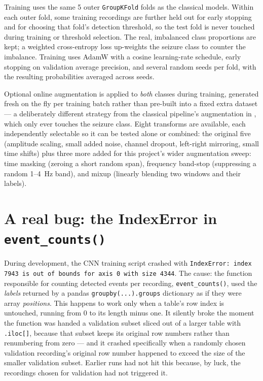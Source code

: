 Training uses the same 5 outer \texttt{GroupKFold} folds as the classical models. Within each
outer fold, some training recordings are further held out for early stopping and for choosing
that fold's detection threshold, so the test fold is never touched during training or threshold
selection. The real, imbalanced class proportions are kept; a weighted cross-entropy loss
up-weights the seizure class to counter the imbalance. Training uses AdamW with a cosine
learning-rate schedule, early stopping on validation average precision, and several random seeds
per fold, with the resulting probabilities averaged across seeds.

Optional online augmentation is applied to \emph{both} classes during training, generated fresh
on the fly per training batch rather than pre-built into a fixed extra dataset --- a
deliberately different strategy from the classical pipeline's augmentation in
, which only ever touches the seizure class. Eight transforms are
available, each independently selectable so it can be tested alone or combined: the original
five (amplitude scaling, small added noise, channel dropout, left-right mirroring, small time
shifts) plus three more added for this project's wider augmentation sweep: time masking
(zeroing a short random span), frequency band-stop (suppressing a random 1--4~Hz band), and
mixup (linearly blending two windows and their labels).

\section{A real bug: the IndexError in \texttt{event\_counts()}}

During development, the CNN training script crashed with
\texttt{IndexError: index 7943 is out of bounds for axis 0 with size 4344}. The cause: the
function responsible for counting detected events per recording, \texttt{event\_counts()}, used
the \emph{labels} returned by a pandas \texttt{groupby(...).groups} dictionary as if they were
array \emph{positions}. This happens to work only when a table's row index is untouched,
running from 0 to its length minus one. It silently broke the moment the function was handed a
validation subset sliced out of a larger table with \texttt{.iloc[]}, because that subset keeps
its original row numbers rather than renumbering from zero --- and it crashed specifically when
a randomly chosen validation recording's original row number happened to exceed the size of the
smaller validation subset. Earlier runs had not hit this because, by luck, the recordings chosen
for validation had not triggered it.

